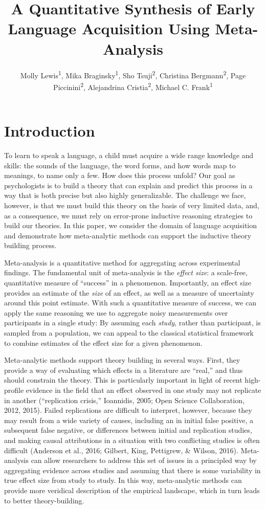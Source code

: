 \documentclass[english,floatsintext,man]{apa6}
\title{A Quantitative Synthesis of Early Language Acquisition Using
Meta-Analysis}
\author{
          Molly Lewis\textsuperscript{1},
          Mika Braginsky\textsuperscript{1},
          Sho Tsuji\textsuperscript{2},
          Christina Bergmann\textsuperscript{2},
          Page Piccinini\textsuperscript{2},
          Alejandrina Cristia\textsuperscript{2},
          Michael C. Frank\textsuperscript{1}  }
\affiliation{
    \vspace{0.5cm}
          \textsuperscript{1} Department Psychology, Stanford University\\
          \textsuperscript{2} Laboratoire de Sciences Cognitives et Psycholinguistique, ENS  }
\begin{document}
\maketitle



\section{Introduction}\label{introduction}

To learn to speak a language, a child must acquire a wide range
knowledge and skills: the sounds of the language, the word forms, and
how words map to meanings, to name only a few. How does this process
unfold? Our goal as psychologists is to build a theory that can explain
and predict this process in a way that is both precise but also highly
generalizable. The challenge we face, however, is that we must build
this theory on the basis of very limited data, and, as a consequence, we
must rely on error-prone inductive reasoning strategies to build our
theories. In this paper, we consider the domain of language acquisition
and demonstrate how meta-analytic methods can support the inductive
theory building process.

Meta-analysis is a quantitative method for aggregating across
experimental findings. The fundamental unit of meta-analysis is the
\emph{effect size}: a scale-free, quantitative measure of
\enquote{success} in a phenomenon. Importantly, an effect size provides
an estimate of the \emph{size} of an effect, as well as a measure of
uncertainty around this point estimate. With such a quantitative measure
of success, we can apply the same reasoning we use to aggregate noisy
measurements over participants in a single study: By assuming each
\emph{study}, rather than participant, is sampled from a population, we
can appeal to the classical statistical framework to combine estimates
of the effect size for a given phenomenon.

Meta-analytic methods support theory building in several ways. First,
they provide a way of evaluating which effects in a literature are
\enquote{real,} and thus should constrain the theory. This is
particularly important in light of recent high-profile evidence in the
field that an effect observed in one study may not replicate in another
(``replication crisis,'' Ioannidis, 2005; Open Science Collaboration,
2012, 2015). Failed replications are difficult to interpret, however,
because they may result from a wide variety of causes, including an in
initial false positive, a subsequent false negative, or differences
between initial and replication studies, and making causal attributions
in a situation with two conflicting studies is often difficult (Anderson
et al., 2016; Gilbert, King, Pettigrew, \& Wilson, 2016). Meta-analysis
can allow researchers to address this set of issues in a principled way
by aggregating evidence across studies and assuming that there is some
variability in true effect size from study to study. In this way,
meta-analytic methods can provide more veridical description of the
empirical landscape, which in turn leads to better theory-building.
\end{document}
